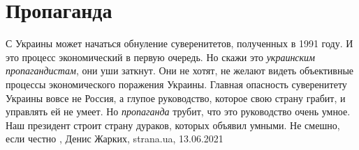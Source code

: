  
 
 
 
 
\chapter{Пропаганда}
\label{sec:slova.propaganda}

С Украины может начаться обнуление суверенитетов, полученных в 1991 году. И это
процесс экономический в первую очередь. Но скажи это \emph{украинским пропагандистам},
они уши заткнут. Они не хотят, не желают видеть объективные процессы
экономического поражения Украины. Главная опасность суверенитету Украины вовсе
не Россия, а глупое руководство, которое свою страну грабит, и управлять ей не
умеет. Но \emph{пропаганда} трубит, что это руководство очень умное. Наш президент
строит страну дураков, которых объявил умными. Не смешно, если честно
, 
Денис Жарких, strana.ua, 13.06.2021

